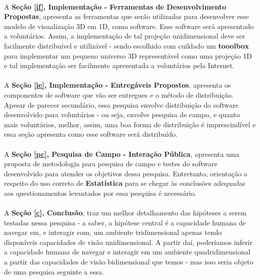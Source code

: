 \documentclass{article}
\begin{document}
	\paragraph{}
	A \textbf{Seção \ref{if}, Implementação - Ferramentas de Desenvolvimento Propostas}, apresenta as ferramentas que serão utilizadas para desenvolver esse modelo de visualização 3D em 1D, como software. Esse software será apresentado a voluntários. Assim, a implementação de tal projeção unidimensional deve ser facilmente distribuível e utilizável - sendo escolhido com cuildado um \textbf{tooolbox} para implementar um pequeno universo 3D representável como uma projeção 1D e tal implementação ser facilmente apresentada a voluntários pela Internet.
	
	\paragraph{}
	A \textbf{Seção \ref{ie}, Implementação - Entregáveis Propostos}, apresenta os componentes de software que vão ser entregues e o método de distribuição. Apesar de parecer secundário, essa pesquisa envolve distribuição do software desenvolvido para voluntários - ou seja, envolve pesquisa de campo, e quanto mais voluntários, melhor, assim, uma boa forma de distribuição é imprescindível e essa seção apresenta como esse software será distribuído.
	
	\paragraph{}
	A \textbf{Seção \ref{pc}, Pesquisa de Campo - Interação Pública}, apresenta uma proposta de metodologia para pesquisa de campo e testes do software desenvolvido para atender os objetivos dessa pesquisa. Entretanto, orientação a respeito do uso correto de \textbf{Estatística} para se chegar às conclusões adequadas aos questionamentos levantados por essa pesquisa é necessário.
	
	\paragraph{}
	A \textbf{Seção \ref{c}, Conclusão}, traz um melhor detalhamento das hipóteses a serem testadas nessa pesquisa - a saber, a hipótese central é a capacidade humana de navegar em, e interagir com, um ambiente tridimensional apenas tendo disponíveis capacidades de visão unidimensional. A partir daí, poderíamos inferir a capacidade humana de navegar e interagir em um ambiente quadridimensional a partir das capacidades de visão bidimensional que temos - mas isso seria objeto de uma pesquisa seguinte a essa.
		
\end{document}

